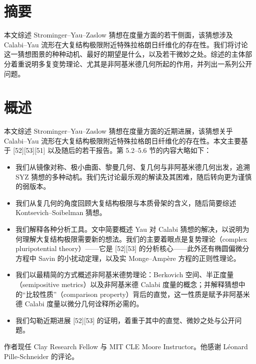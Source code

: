 
\section*{摘要}

本文综述 Strominger--Yau--Zaslow 猜想在度量方面的若干侧面，该猜想涉及 Calabi--Yau 流形在大复结构极限附近特殊拉格朗日纤维化的存在性。我们将讨论这一猜想图景的种种动机、最好的期望是什么，以及若干微妙之处。综述的主体部分着重说明多复变势理论、尤其是非阿基米德几何所起的作用，并列出一系列公开问题。

\section{概述}

本文综述 Strominger--Yau--Zaslow 猜想在度量方面的近期进展，该猜想关乎 Calabi--Yau 流形在大复结构极限附近特殊拉格朗日纤维化的存在性。本文主要基于 [52][53][51] 以及随后的若干报告。第 5.2--5.6 节的内容大略如下：

\begin{itemize}
\item 我们从镜像对称、极小曲面、黎曼几何、复几何与非阿基米德几何出发，追溯 SYZ 猜想的多种动机。我们先讨论最乐观的解读及其困难，随后转向更为谨慎的弱版本。
\item 我们从复几何的角度回顾大复结构极限与本质骨架的含义，随后简要综述 Kontsevich--Soibelman 猜想。
\item 我们解释各种分析工具。文中简要概述 Yau 对 Calabi 猜想的解决，以说明为何理解大复结构极限需要新的想法。我们的主要着眼点是复势理论（complex pluripotential theory）------它是 [52][53] 的分析核心------此外还有椭圆偏微分方程中 Savin 的小扰动定理，以及实 Monge--Ampère 方程的正则性理论。
\item 我们以最精简的方式概述非阿基米德势理论：Berkovich 空间、半正度量（semipositive metrics）以及非阿基米德 Calabi 度量的概念；并解释猜想中的“比较性质”（comparison property）背后的直觉，这一性质是赋予非阿基米德 Calabi 度量以微分几何诠释所必需的。
\item 我们勾勒近期进展 [52][53] 的证明，着重于其中的直觉、微妙之处与公开问题。
\end{itemize}


作者现任 Clay Research Fellow 与 MIT CLE Moore Instructor。他感谢 Léonard Pille-Schneider 的评论。

